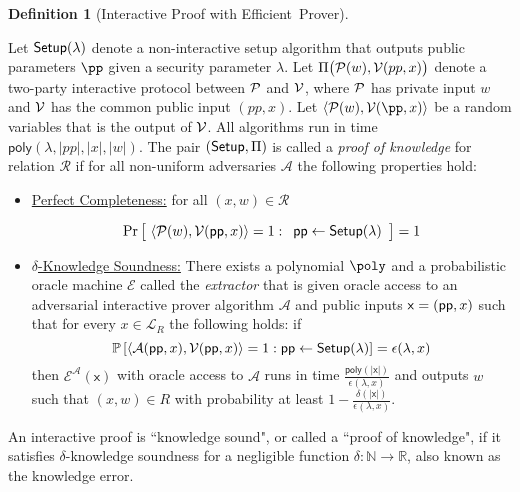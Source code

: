 \documentclass{article}
\theoremstyle{definition}
\newtheorem{definition}{Definition}
\begin{document}
\begin{definition} [Interactive Proof with Efficient\footnotemark \ Prover]\label{def:proof}
 
Let $\textsf{{Setup}}(\lambda)$ denote a non-interactive setup algorithm that outputs public parameters $\pp$ given a security parameter $\lambda$. Let $\Pi\bigl(\mathcal{P}(w), \mathcal{V}(pp, x)\bigr)$ denote a two-party interactive protocol between $\mathcal{P}$ and $\mathcal{V}$, where $\mathcal{P}$ has private input $w$ and $\mathcal{V}$ has the common public input $(pp, x)$. Let $\langle \prover(w), \verifier(\pp, x) \rangle$ be a random variables that is the output of $\mathcal{V}$. All algorithms run in time $\textsf{poly}(\lambda, |pp|, |x|, |w|)$. The pair $(\textsf{{Setup}}, \Pi)$ is called a \emph{proof of knowledge} for relation $\mathcal{R}$ if for all non-uniform adversaries $\mathcal{A}$ the following properties hold: 

\begin{itemize}
\item \underline{Perfect Completeness:} for all $(x,w) \in \mathcal{R}$
\begin{small}
\[
\Pr \left[
         \ \langle \mathcal{P}(w), \mathcal{V}(\textsf{pp}, x) \rangle = 1 \\
:
\begin{array}{c}
             \textsf{pp} \leftarrow \textsf{{Setup}}(\lambda) \\
\end{array} 
\right]  = 1 
 \]
 \end{small}
\item \underline{$\delta$-Knowledge Soundness:}
There exists a polynomial $\poly$ and a probabilistic oracle machine $\mathcal{E}$ called the \emph{extractor} that is given oracle access to an adversarial interactive prover algorithm $\mathcal{A}$ and public inputs $\mathsf{x} = (\textsf{pp}, x)$ such that for every $x \in \mathcal{L}_R$ the following holds: if
$$\mathbb{P}\left[\langle \mathcal{A}(\textsf{pp}, x), \mathcal{V}(\textsf{pp}, x) \rangle = 1  : \textsf{pp} \gets \textsf{{Setup}}(\lambda) \right] = \epsilon(\lambda, x)$$
 then $\mathcal{E}^\mathcal{A}(\mathsf{x})$ with oracle access to $\mathcal{A}$ runs in time $\frac{\mathsf{poly}(|\mathsf{x}|)}{\epsilon(\lambda, x)}$ and outputs $w$ such that $(x, w) \in R$ with probability at least $1 - \frac{\delta(|\mathsf{x}|)}{\epsilon(\lambda, x)}$. 
\end{itemize} 
An interactive proof is ``knowledge sound", or called a ``proof of knowledge", if it satisfies $\delta$-knowledge soundness for a negligible function $\delta:\mathbb{N} \rightarrow \mathbb{R}$, also known as the knowledge error. 
\end{definition} 
\end{document}
